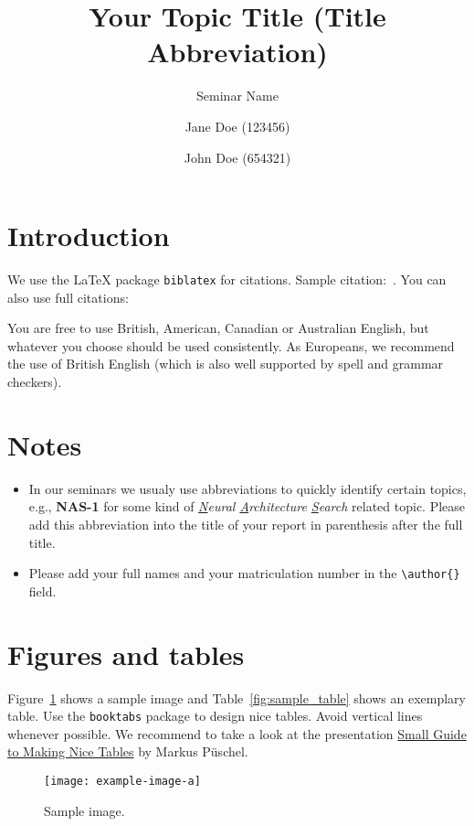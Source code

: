 \documentclass[review]{AIM_report}
\title{Your Topic Title (Title Abbreviation)}
\subtitle{Seminar Name}
\author{Jane Doe (123456) \and John Doe (654321)}
\institute{RWTH Aachen University, Germany\\
\email{$\{$jane.doe, john.doe$\}$@rwth-aachen.de}}
\begin{document}
\maketitle

\section{Introduction}

We use the \LaTeX{} package \texttt{biblatex} for citations. Sample citation:~\cite{HutterEtAl2009}. You can also use full citations: 

You are free to use British, American, Canadian or Australian English, but whatever you choose should be used consistently.
As Europeans, we recommend the use of British English (which is also well supported by spell and grammar checkers).

\section{Notes}

\begin{itemize}
  \item In our seminars we usualy use abbreviations to quickly identify certain topics, e.g., \textbf{NAS-1} for some kind of \emph{\underline{N}eural \underline{A}rchitecture \underline{S}earch} related topic. Please add this abbreviation into the title of your report in parenthesis after the full title.
  \item Please add your full names and your matriculation number in the \verb|\author{}| field.
\end{itemize}

\section{Figures and tables}

Figure~\ref{fig:sample_image} shows a sample image and Table~\ref{fig:sample_table} shows an exemplary table. Use the \texttt{booktabs} package to design nice tables. Avoid vertical lines whenever possible. We recommend to take a look at the presentation \href{https://people.inf.ethz.ch/markusp/teaching/guides/guide-tables.pdf}{Small Guide to Making Nice Tables} by Markus P\"uschel.

\begin{figure}
    \centering
    \texttt{[image: example-image-a]}
    \caption{Sample image.}
    \label{fig:sample_image}
\end{figure}
\end{document}
